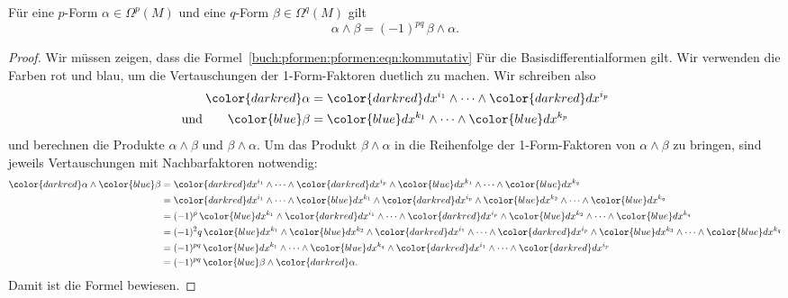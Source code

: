 \begin{satz}
Für eine $p$-Form $\alpha\in\Omega^p(M)$ und eine $q$-Form
$\beta\in\Omega^q(M)$ gilt
\begin{equation}
\alpha\wedge\beta
=
(-1)^{pq}\,\beta\wedge\alpha.
\label{buch:pformen:pformen:eqn:kommutativ}
\end{equation}
\end{satz}

\begin{proof}
Wir müssen zeigen, dass die
Formel~\eqref{buch:pformen:pformen:eqn:kommutativ}
Für die Basisdifferentialformen gilt.
Wir verwenden die Farben {\color{darkred}rot} und {\color{blue}blau},
um die Vertauschungen der 1-Form-Faktoren duetlich zu machen.
Wir schreiben also
\begin{align*}
{\color{darkred}\alpha}
&=
{\color{darkred}dx^{i_1}}
\wedge \dots \wedge
{\color{darkred}dx^{i_p}}
\\
\text{und}\qquad
{\color{blue}\beta}
&=
{\color{blue}dx^{k_1}}
\wedge \dots \wedge
{\color{blue}dx^{k_p}}
\end{align*}
und berechnen die Produkte $\alpha\wedge\beta$ und $\beta\wedge\alpha$.
Um das Produkt $\beta\wedge\alpha$ in die Reihenfolge der 1-Form-Faktoren
von $\alpha\wedge\beta$ zu bringen, sind jeweils Vertauschungen mit
Nachbarfaktoren notwendig:
\begin{align*}
{\color{darkred}\alpha}\wedge{\color{blue}\beta}
&=
{\color{darkred}dx^{i_1}}
\wedge\dots\wedge
{\color{darkred}dx^{i_p}}
\wedge
{\color{blue}dx^{k_1}}
\wedge\dots\wedge
{\color{blue}dx^{k_q}}
\\
&=
{\color{darkred}dx^{i_1}}
\wedge\dots\wedge
{\color{blue}dx^{k_1}}
\wedge
{\color{darkred}dx^{i_p}}
\wedge
{\color{blue}dx^{k_2}}
\wedge\dots\wedge
{\color{blue}dx^{k_q}}
\\
&=
(-1)^p
\,
{\color{blue}dx^{k_1}}
\wedge
{\color{darkred}dx^{i_1}}
\wedge\dots\wedge
{\color{darkred}dx^{i_p}}
\wedge
{\color{blue}dx^{k_2}}
\wedge\dots\wedge
{\color{blue} dx^{k_q}}
\\
&=
(-1)^2q
\,
{\color{blue}dx^{k_1}}
\wedge
{\color{blue}dx^{k_2}}
\wedge
{\color{darkred}dx^{i_1}}
\wedge\dots\wedge
{\color{darkred}dx^{i_p}}
\wedge
{\color{blue}dx^{k_3}}
\wedge\dots\wedge
{\color{blue} dx^{k_q}}
\\
&=
(-1)^{pq}
\,
{\color{blue}dx^{k_1}}
\wedge\dots\wedge
{\color{blue}dx^{k_q}}
\wedge
{\color{darkred}dx^{i_1}}
\wedge\dots\wedge
{\color{darkred}dx^{i_p}}
\\
&=
(-1)^{pq}
\,
{\color{blue}\beta}\wedge{\color{darkred}\alpha}.
\end{align*}
Damit ist die Formel bewiesen.
\end{proof}

